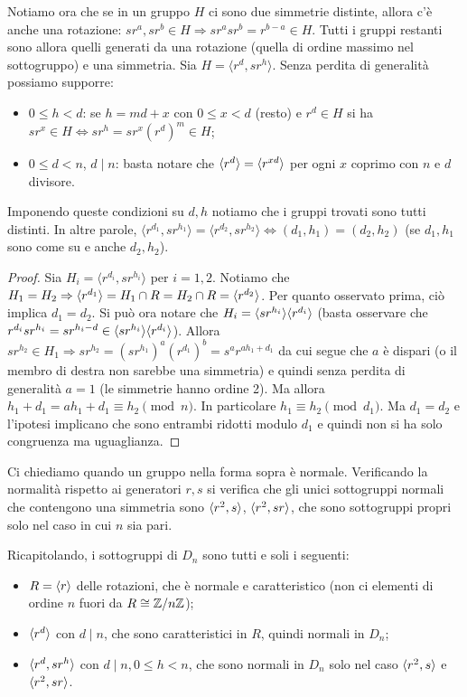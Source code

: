 Notiamo ora che se in un gruppo $H$ ci sono due simmetrie distinte, allora c'è anche una rotazione: $sr^a, sr^b \in H \Rightarrow sr^asr^b = r^{b-a} \in H$. Tutti i gruppi restanti sono allora quelli generati da una rotazione (quella di ordine massimo nel sottogruppo) e una simmetria. Sia $H = \langle r^d, sr^h \rangle$. Senza perdita di generalità possiamo supporre:
\begin{itemize}
    \item $0 \leq h < d$: se $h = md + x$ con $0 \leq x < d$ (resto) e $r^d \in H$ si ha $sr^x\in H \iff sr^h = sr^x(r^d)^m \in H$;
    \item $0 \leq d < n$, $d \mid n$: basta notare che $\langle r^d \rangle = \langle r^{xd} \rangle$ per ogni $x$ coprimo con $n$ e $d$ divisore.
\end{itemize}
Imponendo queste condizioni su $d,h$ notiamo che i gruppi trovati sono tutti distinti. In altre parole, $\langle r^{d_1}, sr^{h_1} \rangle = \langle r^{d_2}, sr^{h_2} \rangle \iff (d_1,h_1) = (d_2,h_2)$ (se $d_1,h_1$ sono come su e anche $d_2,h_2$).
\begin{proof}
    Sia $H_i = \langle r^{d_i}, sr^{h_i} \rangle$ per $i = 1,2$. Notiamo che $H_1 = H_2 \Rightarrow \langle r^{d_1} \rangle = H_1 \cap R = H_2 \cap R = \langle r^{d_2} \rangle$. Per quanto osservato prima, ciò implica $d_1 = d_2$. Si può ora notare che $H_i = \langle sr^{h_i} \rangle\langle r^{d_i} \rangle$ (basta osservare che $r^{d_i}sr^{h_i}=sr^{h_i-d} \in \langle sr^{h_i} \rangle\langle r^{d_i} \rangle$). Allora $sr^{h_2} \in H_1  \Rightarrow sr^{h_2} = (sr^{h_1})^a(r^{d_1})^b = s^ar^{ah_1+d_1}$ da cui segue che $a$ è dispari (o il membro di destra non sarebbe una simmetria) e quindi senza perdita di generalità $a =1$ (le simmetrie hanno ordine 2). Ma allora $h_1 + d_1 = ah_1 + d_1 \equiv h_2 \pmod{n}$. In particolare $h_1 \equiv h_2 \pmod{d_1}$. Ma $d_1 = d_2$ e l'ipotesi implicano che sono entrambi ridotti modulo $d_1$ e quindi non si ha solo congruenza ma uguaglianza.
\end{proof}
Ci chiediamo quando un gruppo nella forma sopra è normale. Verificando la normalità rispetto ai generatori $r,s$ si verifica che gli unici sottogruppi normali che contengono una simmetria sono $\langle r^2, s \rangle$, $\langle r^2, sr \rangle$, che sono sottogruppi propri solo nel caso in cui $n$ sia pari.

Ricapitolando, i sottogruppi di $D_n$ sono tutti e soli i seguenti:
\begin{itemize}
    \item $R = \langle r \rangle$ delle rotazioni, che è normale e caratteristico (non ci elementi di ordine $n$ fuori da $R\cong \mathbb{Z}/n\mathbb{Z}$);
    \item $\langle r^d \rangle$ con $d\mid n$, che sono caratteristici in $R$, quindi normali in $D_n$;
    \item $\langle r^d, sr^h \rangle$ con $d \mid n, 0\leq h < n$, che sono normali in $D_n$ solo nel caso $\langle r^2, s \rangle$ e $\langle r^2, sr \rangle$.
\end{itemize}

